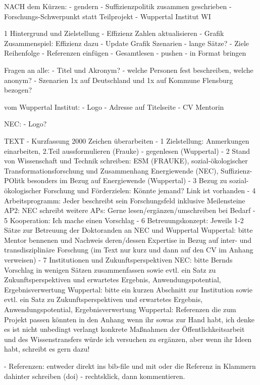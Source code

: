 NACH dem Kürzen:
- gendern
- Suffizienzpolitik zusammen geschrieben
- Forschungs-Schwerpunkt statt Teilprojekt
- Wuppertal Institut WI



1 Hintergrund und Zielstellung
- Effizienz Zahlen aktualisieren
- Grafik Zusammenspiel: Effizienz dazu
- Update Grafik Szenarien
- lange Sätze?
- Ziele Reihenfolge
- Referenzen einfügen
- Gesamtlesen
- pushen
- in Format bringen


Fragen an alle:
- Titel und Akronym?
- welche Personen fest beschreiben, welche anonym?
- Szenarien 1x auf Deutschland und 1x auf Kommune Flensburg bezogen?

vom Wuppertal Institut:
- Logo
- Adresse auf Titelseite
- CV Mentorin


NEC:
- Logo?


TEXT
- Kurzfassung 2000 Zeichen überarbeiten
- 1 Zielstellung: Anmerkungen einarbeiten, 2.Teil aussformulieren (Frauke) - gegenlesen (Wuppertal)
- 2 Stand von Wissenschaft und Technik schreiben: ESM (FRAUKE), sozial-ökologischer Transformationsforschung und Zusammenhang Energiewende (NEC), Suffizienz-POlitk besonders im Bezug auf Energiewende (Wuppertal)
- 3 Bezug zu sozial-ökologischer Forschung und Förderzielen: Könnte jemand? Link ist vorhanden
- 4 Arbeitsprogramm:
Jeder beschreibt sein Forschungsfeld inklusive Meilensteine
AP2: NEC schreibt
weitere APs: Gerne lesen/ergänzen/umschreiben bei Bedarf
- 5 Kooperation: Ich mache einen Vorschlag
- 6 Betreuungskonzept:
Jeweils 1-2 Sätze zur Betreuung der Doktoranden an NEC und Wuppertal
Wuppertal: bitte Mentor bennenen und Nachweis deren/dessen Expertise in Bezug auf inter- und transdisziplinäre Forschung (im Text nur kurz und dann auf den CV im Anhang verweisen)
- 7 Institutionen und Zukunftsperspektiven
NEC: bitte Bernds Vorschlag in wenigen Sätzen zusammenfassen sowie evtl. ein Satz zu Zukunftsperspektiven und erwartetes Ergebnis, Anwendungspotential, Ergebnisverwertung
Wuppertal: bitte ein kurzen Abschnitt zur Institution sowie evtl. ein Satz zu Zukunftsperspektiven und erwartetes Ergebnis, Anwendungspotential, Ergebnisverwertung
Wuppertal: Referenzen die zum Projekt passen könnten in den Anhang wenn ihr sowas zur Hand habt, ich denke es ist nicht unbedingt verlangt
konkrete Maßnahmen der Öffentlichkeitsarbeit und des Wissenstransfers würde ich versuchen zu ergänzen, aber wenn ihr Ideen habt, schreibt es gern dazu!


- Referenzen: entweder direkt ins bib-file und mit \cite{}  oder die Referenz in Klammern dahinter schreiben (doi)
- rechtsklick, dann kommentieren.
